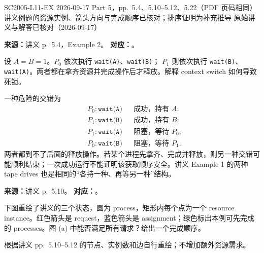

\examplemeta
  {SC2005-L11-EX}
  {2026-09-17}
  {Part 5，pp.~5.4、5.10--5.12、5.22（PDF 页码相同）}
  {讲义例题的资源实例、箭头方向与完成顺序已核对；排序证明为补充推导}
  {原始讲义与解答已核对（2026-09-17）}


\textbf{来源：}讲义 p.~5.4，Example 2。\quad
\textbf{对应：}。

设 $A=B=1$。$P_0$ 依次执行 \texttt{wait(A)}、\texttt{wait(B)}；
$P_1$ 则依次执行 \texttt{wait(B)}、\texttt{wait(A)}。两者都在拿齐资源并完成操作后才释放。解释 context switch 如何导致死锁。

\begin{checkedsolution}
一种危险的交错为
\[
\begin{aligned}
  &P_0:\texttt{wait(A)} &&\text{成功，持有 }A;\\
  &P_1:\texttt{wait(B)} &&\text{成功，持有 }B;\\
  &P_1:\texttt{wait(A)} &&\text{阻塞，等待 }P_0;\\
  &P_0:\texttt{wait(B)} &&\text{阻塞，等待 }P_1.
\end{aligned}
\]
两者都到不了后面的释放操作。若某个进程先拿齐、完成并释放，则另一种交错可能顺利结束；一次成功运行不能证明该获取顺序安全。讲义 Example 1 的两种 tape drives 也是相同的“各持一种、再等另一种”结构。
\end{checkedsolution}


\textbf{来源：}讲义 p.~5.10。\quad
\textbf{对应：}。

下图重绘了讲义的三个状态，圆为 process，矩形内每个点为一个 resource instance。红色箭头是 request，蓝色箭头是 assignment；绿色标出本例可先完成的 processes。图 (a) 中能否满足所有请求？给出一个完成顺序。

\begin{center}
  \resizebox{0.99\textwidth}{!}{}
  \par\small 根据讲义 pp.~5.10--5.12 的节点、实例数和边自行重绘；不增加额外资源需求。
\end{center}

